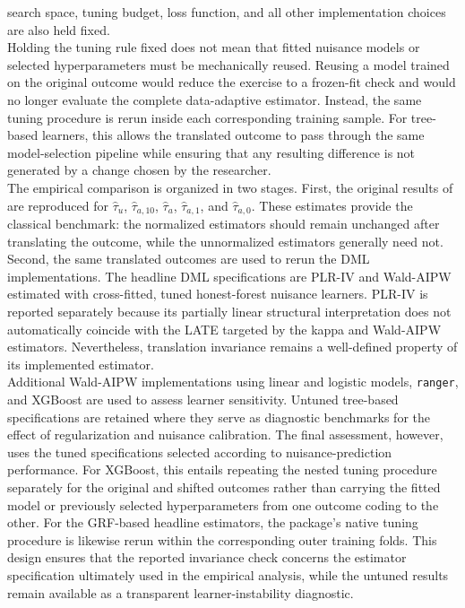 \documentclass[12pt, a4paper, oneside]{article}
\theoremstyle{plain}
\theoremstyle{definition}
\begin{document}
search space, tuning budget, loss function, and all other implementation
choices are also held fixed.\\
Holding the tuning rule fixed does not mean that fitted nuisance models or
selected hyperparameters must be mechanically reused. Reusing a model trained
on the original outcome would reduce the exercise to a frozen-fit check and
would no longer evaluate the complete data-adaptive estimator. Instead, the
same tuning procedure is rerun inside each corresponding training sample.
For tree-based learners, this allows the translated outcome to pass through
the same model-selection pipeline while ensuring that any resulting difference
is not generated by a change chosen by the researcher. \\
The empirical comparison is organized in two stages. First, the original
results of \citet{sloczynski2025abadie} are reproduced for
\(\widehat{\tau}_{u}\),
\(\widehat{\tau}_{a,10}\),
\(\widehat{\tau}_{a}\),
\(\widehat{\tau}_{a,1}\), and
\(\widehat{\tau}_{a,0}\). These estimates provide the classical benchmark:
the normalized estimators should remain unchanged after translating the
outcome, while the unnormalized estimators generally need not. Second, the
same translated outcomes are used to rerun the DML implementations. The
headline DML specifications are PLR-IV and Wald-AIPW estimated with
cross-fitted, tuned honest-forest nuisance learners. PLR-IV is reported
separately because its partially linear structural interpretation does not
automatically coincide with the LATE targeted by the kappa and Wald-AIPW
estimators. Nevertheless, translation invariance remains a well-defined
property of its implemented estimator.\\
Additional Wald-AIPW implementations using linear and logistic models,
\texttt{ranger}, and XGBoost are used to assess learner sensitivity. Untuned
tree-based specifications are retained where they serve as diagnostic
benchmarks for the effect of regularization and nuisance calibration. The
final assessment, however, uses the tuned specifications selected
according to nuisance-prediction performance. For XGBoost, this entails
repeating the nested tuning procedure separately for the original and shifted
outcomes rather than carrying the fitted model or previously selected
hyperparameters from one outcome coding to the other. For the GRF-based
headline estimators, the package's native tuning procedure is likewise rerun
within the corresponding outer training folds. This design ensures that the
reported invariance check concerns the estimator specification ultimately used
in the empirical analysis, while the untuned results remain available as a
transparent learner-instability diagnostic.
\end{document}
